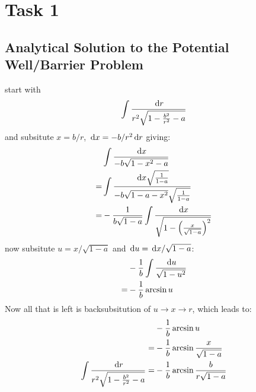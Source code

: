 

\section{Task 1}
\subsection{Analytical Solution to the Potential Well/Barrier Problem}
start with
\begin{align}
  \int \frac{\,\text{d}r}{r^2\sqrt{1-\frac{b^2}{r^2}-a}}
\end{align}
and subsitute $x = b/r$, $\,\text{d}x = -b/r^2 \,\text{d}r$ giving:
\begin{align}
  &\int \frac{\,\text{d}x}{-b\sqrt{1-x^2-a}}\\\nonumber
  =&\int \frac{\,\text{d}x \sqrt{\frac{1}{1-a}}}{-b \sqrt{1-a-x^2}\sqrt{\frac{1}{1-a}}}\\\nonumber
  =&-\frac{1}{b\sqrt{1-a}}\int\frac{\,\text{d}x}{\sqrt{1-\left(\frac{x}{\sqrt{1-a}}\right)^2}}
\end{align}
now subsitute $u = x/\sqrt{1-a}$ and $\,\text{d}u = \,\text{d}x/\sqrt{1-a}$:
\begin{align}
  &-\frac{1}{b}\int\frac{\,\text{d}u}{\sqrt{1-u^2}}\\\nonumber
  = &-\frac{1}{b} \arcsin u
\end{align}
Now all that is left is backsubsitution of $u\to x \to r$, which leads to:
\begin{align}
  &-\frac{1}{b} \arcsin u\\\nonumber
  =&-\frac{1}{b} \arcsin \frac{x}{\sqrt{1-a}}\\\nonumber
  \int \frac{\,\text{d}r}{r^2\sqrt{1-\frac{b^2}{r^2}-a}}=&-\frac{1}{b} \arcsin \frac{b}{r\sqrt{1-a}}
\end{align}

